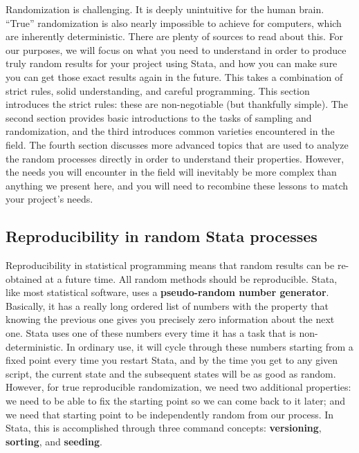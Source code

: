 Randomization is challenging. It is deeply unintuitive for the human brain.
``True'' randomization is also nearly impossible to achieve for computers,
which are inherently deterministic. There are plenty of sources to read about this.
For our purposes, we will focus on what you need to understand
in order to produce truly random results for your project using Stata,
and how you can make sure you can get those exact results again in the future.
This takes a combination of strict rules, solid understanding, and careful programming.
This section introduces the strict rules: these are non-negotiable (but thankfully simple).
The second section provides basic introductions to the tasks of sampling and randomization,
and the third introduces common varieties encountered in the field.
The fourth section discusses more advanced topics that are used
to analyze the random processes directly in order to understand their properties.
However, the needs you will encounter in the field will inevitably
be more complex than anything we present here,
and you will need to recombine these lessons to match your project's needs.

\subsection{Reproducibility in random Stata processes}

Reproducibility in statistical programming means that random results
can be re-obtained at a future time.
All random methods should be reproducible.\cite{orozco2018make}
Stata, like most statistical software, uses a \textbf{pseudo-random number generator}.
Basically, it has a really long ordered list of numbers with the property that
knowing the previous one gives you precisely zero information about the next one.
Stata uses one of these numbers every time it has a task that is non-deterministic.
In ordinary use, it will cycle through these numbers starting from a fixed point
every time you restart Stata, and by the time you get to any given script,
the current state and the subsequent states will be as good as random.
However, for true reproducible randomization, we need two additional properties:
we need to be able to fix the starting point so we can come back to it later;
and we need that starting point to be independently random from our process.
In Stata, this is accomplished through three command concepts:
\textbf{versioning}, \textbf{sorting}, and \textbf{seeding}.

